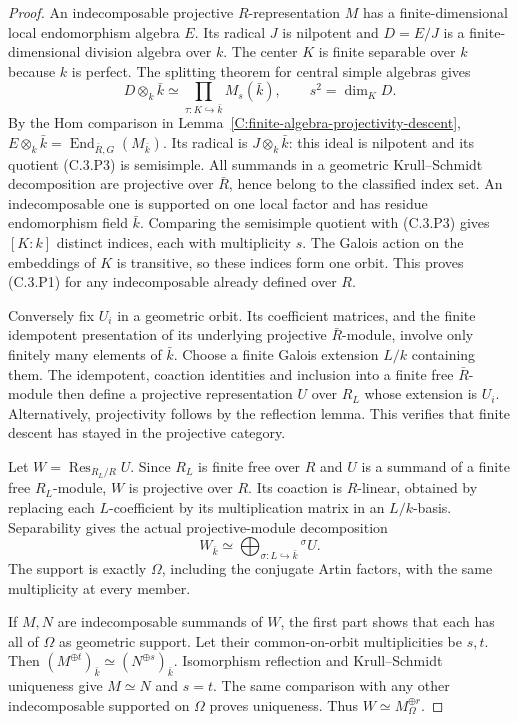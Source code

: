 \begin{proof}
An indecomposable projective $R$-representation $M$ has a
finite-dimensional local endomorphism algebra $E$.
Its radical $J$ is nilpotent and $D=E/J$ is a finite-dimensional
division algebra over $k$. The center $K$ is finite separable
over $k$ because $k$ is perfect. The splitting theorem for
central simple algebras
\cite[Lemma 11.8.6, Tag 0753]{C-StacksPerfectDescent} gives
\[
 D\otimes_k\bar k\simeq
       \prod_{\tau:K\hookrightarrow\bar k}M_s(\bar k),
                   \qquad s^2=\dim_KD .                   \tag{C.3.P3}
\]
By the Hom comparison in
Lemma~\ref{C:finite-algebra-projectivity-descent},
$E\otimes_k\bar k=\operatorname{End}_{\bar R,G}(M_{\bar k})$.
Its radical is $J\otimes_k\bar k$: this ideal is nilpotent
and its quotient (C.3.P3) is semisimple.
All summands in a geometric Krull--Schmidt decomposition are
projective over $\bar R$, hence belong to the classified index
set. An indecomposable one is supported on one local factor
and has residue endomorphism field $\bar k$.
Comparing the semisimple quotient with (C.3.P3) gives
$[K:k]$ distinct indices, each with multiplicity $s$.
The Galois action on the embeddings of $K$ is transitive, so
these indices form one orbit. This proves (C.3.P1) for any
indecomposable already defined over $R$.

Conversely fix $U_i$ in a geometric orbit.
Its coefficient matrices, and the finite idempotent presentation
of its underlying projective $\bar R$-module, involve only
finitely many elements of $\bar k$. Choose a finite Galois
extension $L/k$ containing them. The idempotent, coaction
identities and inclusion into a finite free $\bar R$-module
then define a projective representation $U$ over $R_L$ whose
extension is $U_i$. Alternatively, projectivity follows by
the reflection lemma. This verifies that finite descent
has stayed in the projective category.

Let $W=\operatorname{Res}_{R_L/R}U$.
Since $R_L$ is finite free over $R$ and $U$ is a summand of
a finite free $R_L$-module, $W$ is projective over $R$.
Its coaction is $R$-linear, obtained by replacing each
$L$-coefficient by its multiplication matrix in an $L/k$-basis.
Separability gives the actual projective-module decomposition
\[
 W_{\bar k}\simeq
   \bigoplus_{\sigma:L\hookrightarrow\bar k}{}^\sigma U.    \tag{C.3.P4}
\]
The support is exactly $\Omega$, including the conjugate
Artin factors, with the same multiplicity at every member.

If $M,N$ are indecomposable summands of $W$, the first part
shows that each has all of $\Omega$ as geometric support.
Let their common-on-orbit multiplicities be $s,t$.
Then $(M^{\oplus t})_{\bar k}\simeq
(N^{\oplus s})_{\bar k}$.
Isomorphism reflection and Krull--Schmidt uniqueness give
$M\simeq N$ and $s=t$.
The same comparison with any other indecomposable supported
on $\Omega$ proves uniqueness. Thus $W\simeq M_\Omega^{\oplus r}$.


\end{proof}
